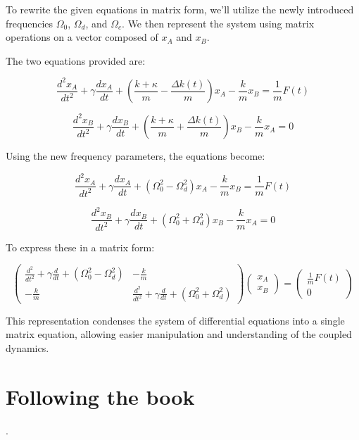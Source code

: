 \begin{airesult}
To rewrite the given equations in matrix form, we'll utilize the newly introduced frequencies
\(\Omega_0\), \(\Omega_d\), and \(\Omega_c\). We then represent the system using matrix operations
on a vector composed of \(x_A\) and \(x_B\).

The two equations provided are:

\vsp

\[
\frac{d^2x_A}{dt^2} + \gamma\frac{dx_A}{dt} + \left( \frac{k + \kappa}{m} - \frac{\Delta k(t)}{m}
\right)x_A
- \frac{k}{m}x_B = \frac{1}{m}F(t)
\]

\[
\frac{d^2x_B}{dt^2} + \gamma\frac{dx_B}{dt} + \left( \frac{k + \kappa}{m} + \frac{\Delta k(t)}{m}
\right)x_B
- \frac{k}{m}x_A = 0
\]

\vsp

Using the new frequency parameters, the equations become:

\vsp

\[
\frac{d^2x_A}{dt^2} + \gamma\frac{dx_A}{dt} + \left( \Omega_0^2 - \Omega_d^2 \right)x_A
- \frac{k}{m}x_B = \frac{1}{m}F(t)
\]

\[
\frac{d^2x_B}{dt^2} + \gamma\frac{dx_B}{dt} + \left( \Omega_0^2 + \Omega_d^2 \right)x_B
- \frac{k}{m}x_A = 0
\]

\vsp

To express these in a matrix form:

\[
\begin{pmatrix}
 \frac{d^2}{dt^2} + \gamma \frac{d}{dt} + (\Omega_0^2 - \Omega_d^2) & -\frac{k}{m} \\
 -\frac{k}{m} & \frac{d^2}{dt^2} + \gamma \frac{d}{dt} + (\Omega_0^2 + \Omega_d^2)
\end{pmatrix}
\begin{pmatrix}
 x_A \\
 x_B
\end{pmatrix}
=
\begin{pmatrix}
 \frac{1}{m}F(t) \\
 0
\end{pmatrix}
\]

\vsp

This representation condenses the system of differential equations into a single matrix equation,
allowing easier manipulation and understanding of the coupled dynamics.
\end{airesult}


\section{Following the book}
.

